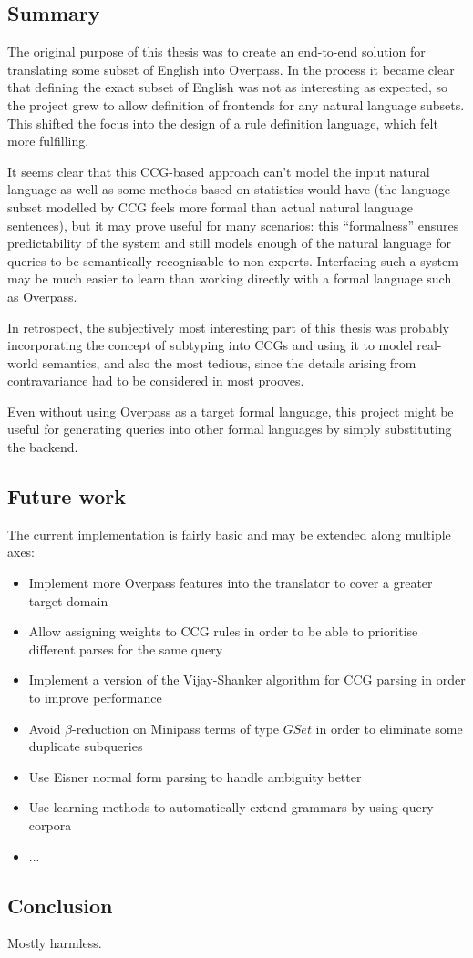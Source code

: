 \documentclass[main.tex]{subfiles}
\begin{document}
\subsection{Summary}

The original purpose of this thesis was to create an end-to-end
solution for translating some subset of English into Overpass.
In the process it became clear that defining the exact subset of English
was not as interesting as expected, so the project grew to allow
definition of frontends for any natural language subsets. This shifted the
focus into the design of a rule definition language, which felt more
fulfilling.

It seems clear that this CCG-based approach can't model the input natural
language as well as some methods based on statistics would have
(the language subset modelled by CCG feels more formal than actual
natural language sentences), but it
may prove useful for many scenarios: this ``formalness'' ensures predictability
of the system and still models enough of the natural language for queries
to be semantically-recognisable to non-experts. Interfacing such a system
may be much easier to learn than working directly with a formal language
such as Overpass.

In retrospect, the subjectively most interesting part of this thesis was probably
incorporating the concept of subtyping into CCGs and using it to model
real-world semantics, and also the most tedious, since the details arising
from contravariance had to be considered in most prooves.

Even without using Overpass as a target formal language, this project might be
useful for generating queries into other formal languages by simply
substituting the backend.

\subsection{Future work}
The current implementation is fairly basic and may be extended along multiple
axes:

\begin{itemize}
    \item Implement more Overpass features into the translator to cover a greater
        target domain
    \item Allow assigning weights to CCG rules in order to be able to prioritise
        different parses for the same query
    \item Implement a version of the Vijay-Shanker algorithm for CCG parsing
        in order to improve performance
    \item Avoid $\beta$-reduction on Minipass terms of type $GSet$ in order
        to eliminate some duplicate subqueries
    \item Use Eisner normal form parsing to handle ambiguity better
    \item Use learning methods to automatically extend grammars by using
        query corpora
    \item ...
\end{itemize}

\pagebreak
\subsection{Conclusion}
Mostly harmless.
\end{document}
